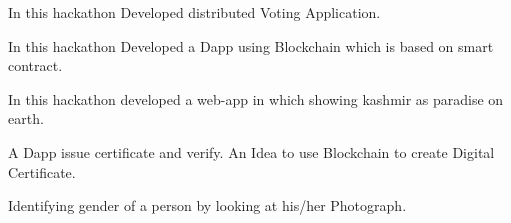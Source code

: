 
\horizontalLineRight

 
\noindent
\hspace{5em}%
\begin{minipage}{0.85\textwidth\vspace{2pt}}
    In this hackathon Developed distributed Voting Application.
\end{minipage}
 
\noindent
\hspace{5em}%
\begin{minipage}{0.85\textwidth\vspace{2pt}}
    In this hackathon Developed a Dapp using Blockchain which is based on smart contract.
\end{minipage}
 
\noindent
\hspace{5em}%
\begin{minipage}{0.85\textwidth\vspace{2pt}}
    In this hackathon developed a web-app in which showing kashmir as paradise on earth.
\end{minipage}

 
\noindent
\hspace{5em}%
\begin{minipage}{0.85\textwidth\vspace{5pt}}
    A Dapp issue certificate and verify. An Idea to use Blockchain to create Digital Certificate.
\end{minipage}
 
\noindent
\hspace{5em}%
\begin{minipage}{0.85\textwidth\vspace{5pt}}
    Identifying gender of a person by looking at his/her Photograph.
\end{minipage}